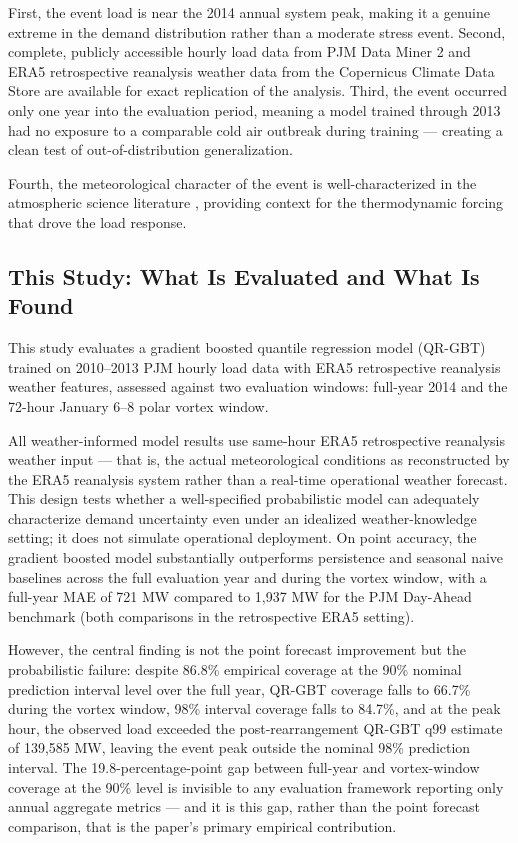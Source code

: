 \documentclass[12pt,a4paper]{article}
\begin{document}
 First, the event load is near the 2014 annual system peak, making it a genuine extreme in the demand distribution rather than a moderate stress event. Second, complete, publicly accessible hourly load data from PJM Data Miner 2 and ERA5 retrospective reanalysis weather data from the Copernicus Climate Data Store are available for exact replication of the analysis. Third, the event occurred only one year into the evaluation period, meaning a model trained through 2013 had no exposure to a comparable cold air outbreak during training --- creating a clean test of out-of-distribution generalization. 

Fourth, the meteorological character of the event is well-characterized in the atmospheric science literature \cite{arritt2014us}, providing context for the thermodynamic forcing that drove the load response.
\subsection{This Study: What Is Evaluated and What Is Found}
This study evaluates a gradient boosted quantile regression model (QR-GBT) trained on 2010–2013 PJM hourly load data with ERA5 retrospective reanalysis weather features, assessed against two evaluation windows: full-year 2014 and the 72-hour January 6–8 polar vortex window. 

All weather-informed model results use same-hour ERA5 retrospective reanalysis weather input --- that is, the actual meteorological conditions as reconstructed by the ERA5 reanalysis system rather than a real-time operational weather forecast. This design tests whether a well-specified probabilistic model can adequately characterize demand uncertainty even under an idealized weather-knowledge setting; it does not simulate operational deployment. On point accuracy, the gradient boosted model substantially outperforms persistence and seasonal naive baselines across the full evaluation year and during the vortex window, with a full-year MAE of 721 MW compared to 1,937 MW for the PJM Day-Ahead benchmark (both comparisons in the retrospective ERA5 setting). 

However, the central finding is not the point forecast improvement but the probabilistic failure: despite 86.8\% empirical coverage at the 90\% nominal prediction interval level over the full year, QR-GBT coverage falls to 66.7\% during the vortex window, 98\% interval coverage falls to 84.7\%, and at the peak hour, the observed load exceeded the post-rearrangement QR-GBT q99 estimate of 139,585 MW, leaving the event peak outside the nominal 98\% prediction interval. The 19.8-percentage-point gap between full-year and vortex-window coverage at the 90\% level is invisible to any evaluation framework reporting only annual aggregate metrics --- and it is this gap, rather than the point forecast comparison, that is the paper's primary empirical contribution.
\end{document}
